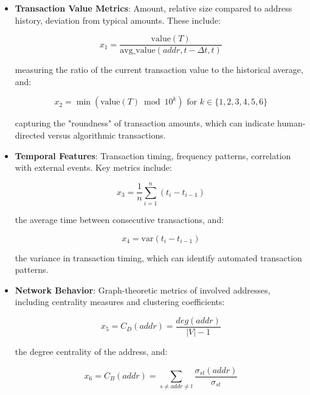 \documentclass[conference]{IEEEtran}
\begin{document}
\begin{itemize}
    \item \textbf{Transaction Value Metrics}: Amount, relative size compared to address history, deviation from typical amounts. These include:
    
    \begin{equation}
    x_1 = \frac{\text{value}(T)}{\text{avg\_value}(addr, t-\Delta t, t)}
    \end{equation}
    
    measuring the ratio of the current transaction value to the historical average, and:
    
    \begin{equation}
    x_2 = \min(\text{value}(T) \bmod 10^k) \text{ for } k \in \{1,2,3,4,5,6\}
    \end{equation}
    
    capturing the "roundness" of transaction amounts, which can indicate human-directed versus algorithmic transactions.
    
    \item \textbf{Temporal Features}: Transaction timing, frequency patterns, correlation with external events. Key metrics include:
    
    \begin{equation}
    x_3 = \frac{1}{n} \sum_{i=1}^{n} (t_i - t_{i-1})
    \end{equation}
    
    the average time between consecutive transactions, and:
    
    \begin{equation}
    x_4 = \text{var}(t_i - t_{i-1})
    \end{equation}
    
    the variance in transaction timing, which can identify automated transaction patterns.
    
    \item \textbf{Network Behavior}: Graph-theoretic metrics of involved addresses, including centrality measures and clustering coefficients:
    
    \begin{equation}
    x_5 = C_D(addr) = \frac{deg(addr)}{|V| - 1}
    \end{equation}
    
    the degree centrality of the address, and:
    
    \begin{equation}
    x_6 = C_B(addr) = \sum_{s \neq addr \neq t} \frac{\sigma_{st}(addr)}{\sigma_{st}}
    \end{equation}
    

\end{itemize}
\end{document}
